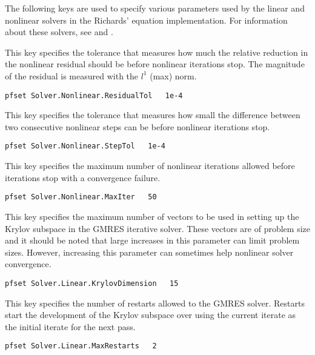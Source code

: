 The following keys are used to specify various parameters used by the linear
and nonlinear solvers in the Richards' equation implementation.
For information about these solvers, see 
\cite{Woodward98} and \cite{Ashby-Falgout90}.

{This key specifies the tolerance that measures how much the relative 
reduction in the nonlinear residual should be before nonlinear 
iterations stop.  The magnitude of the residual is measured with 
the $l^1$ (max) norm.
}
\begin{display}\begin{verbatim}
pfset Solver.Nonlinear.ResidualTol   1e-4
\end{verbatim}\end{display}

{This key specifies the tolerance that measures how small the 
difference between two consecutive nonlinear steps can be before 
nonlinear iterations stop.
}
\begin{display}\begin{verbatim}
pfset Solver.Nonlinear.StepTol   1e-4
\end{verbatim}\end{display}

{This key specifies the maximum number of nonlinear iterations allowed before
iterations stop with a convergence failure.
}
\begin{display}\begin{verbatim}
pfset Solver.Nonlinear.MaxIter   50
\end{verbatim}\end{display}


{This key specifies the maximum number of vectors to be used in setting up the
Krylov subspace in the GMRES iterative solver.  These vectors are of problem
size and it should be noted that large increases in this parameter can limit
problem sizes.  However, increasing this parameter can sometimes help nonlinear
solver convergence.
}
\begin{display}\begin{verbatim}
pfset Solver.Linear.KrylovDimension   15
\end{verbatim}\end{display}

{This key specifies the number of restarts allowed to the GMRES solver.
Restarts start the development of the Krylov subspace over using the current
iterate as the initial iterate for the next pass.
}
\begin{display}\begin{verbatim}
pfset Solver.Linear.MaxRestarts   2
\end{verbatim}\end{display}

